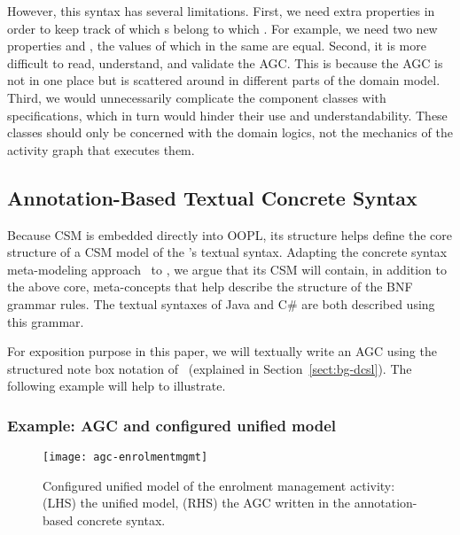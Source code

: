 However, this syntax has several limitations. First, we need extra properties in order to keep track of which s belong to which . For example, we need two new properties  and , the values of which in the same  are equal. 
Second, it is more difficult to read, understand, and validate the AGC. This is because the AGC is not in one place but is scattered around in different parts of the domain model.
Third, we would unnecessarily complicate the component classes with  specifications, which in turn would hinder their use and understandability. These classes should only be concerned with the domain logics, not the mechanics of the activity graph that executes them.

\subsection{Annotation-Based Textual Concrete Syntax} 
\label{sect:agl-csSyntax}

Because CSM is embedded directly into OOPL, its structure helps define the core structure of a CSM model of the \agl's textual syntax. Adapting the concrete syntax meta-modeling approach~\cite{kleppe_software_2008} to \agl, we argue that its CSM will contain, in addition to the above core, meta-concepts that help describe the structure of the BNF grammar rules. The textual syntaxes of Java and C\# are both described using this grammar.

For exposition purpose in this paper, we will textually write an AGC using the structured note box notation of \dcsl~(explained in Section~\ref{sect:bg-dcsl}). The following example will help to illustrate.

\subsubsection*{Example: AGC and configured unified model}
\begin{figure}[ht]
	\begin{center}
		\texttt{[image: agc-enrolmentmgmt]}
	\end{center}
	\caption{Configured unified model of the enrolment management activity: (LHS) the unified model, (RHS) the AGC written in the annotation-based concrete syntax.} %
	\label{fig:agc-enrolmentmgmt}
\end{figure}

